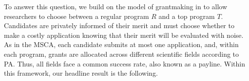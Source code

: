 \documentclass[12pt,reqno]{amsart}
\theoremstyle{definition}
\theoremstyle{plain} %
\begin{document}

\noindent To answer this question, we build on the model of grantmaking in \citet{adda2024grantmaking} to allow researchers to choose between a regular program $R$ and a top program $T$. Candidates are privately informed of their merit and must choose whether to make a costly application knowing that their merit will be evaluated with noise. As in the MSCA, each candidate submits at most one application, and, within each program, grants are allocated across different scientific fields according to PA. Thus, all fields face a common success rate, also known as a payline. Within this framework, our headline result is the following.
\end{document}

